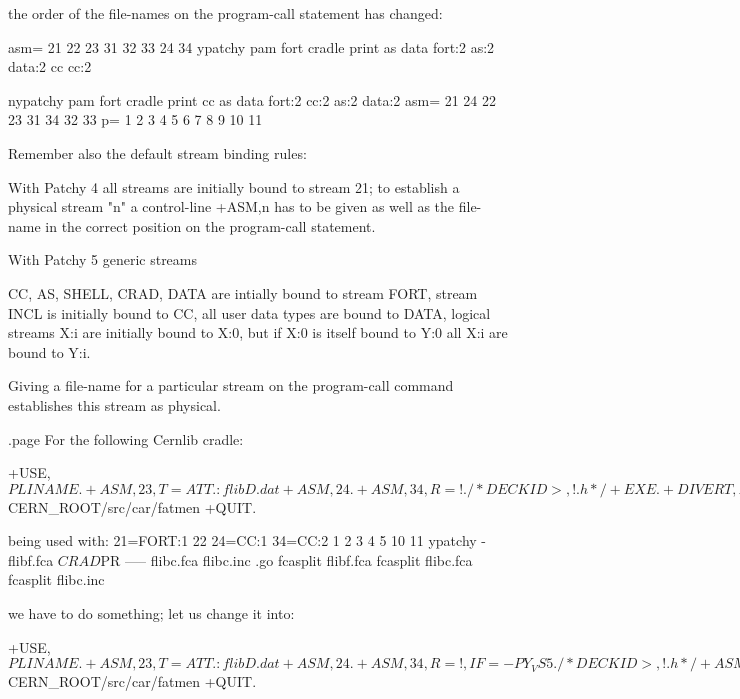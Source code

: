 the order of the file-names on the program-call statement has changed:

       asm=     21                22 23   31     32     33     24   34
    ypatchy pam fort cradle print as data fort:2 as:2   data:2 cc   cc:2

   nypatchy pam fort cradle print cc as   data   fort:2 cc:2   as:2 data:2
       asm=     21                24 22   23     31     34     32   33
         p= 1   2    3      4     5  6    7      8      9      10   11

Remember also the default stream binding rules:

With Patchy 4 all streams are initially bound to stream 21; to establish
a physical stream "n" a control-line  +ASM,n  has to be given as well
as the file-name in the correct position on the program-call statement.

With Patchy 5 generic streams

      CC, AS, SHELL, CRAD, DATA  are intially bound to stream FORT,
      stream  INCL is initially bound to CC,
      all user data types are bound to DATA,
      logical streams X:i are initially bound to X:0, but if X:0
      is itself bound to Y:0 all X:i are bound to Y:i.

      Giving a file-name for a particular stream on the program-call
      command establishes this stream as physical.

.page
For the following Cernlib cradle:

      +USE, ${PLINAME}.
      +ASM, 23, T=ATT    .:flibD.dat
      +ASM, 24.
      +ASM, 34, R=!      ./*DECK ID>, !.h */
      +EXE.
      +DIVERT, FMH.
      +USE, *FATLIB.
      ...
      +PAM, 11, T=C,ATT     .${CERN_ROOT}/src/car/fatmen
      +QUIT.

      being used with:
                    21=FORT:1           22    24=CC:1   34=CC:2
                  1 2         3     4   5     10        11
          ypatchy - flibf.fca $CRAD $PR ----- flibc.fca flibc.inc .go
          fcasplit flibf.fca
          fcasplit flibc.fca
          fcasplit flibc.inc

   we have to do something; let us change it into:

      +USE, ${PLINAME}.
      +ASM, 23, T=ATT    .:flibD.dat
      +ASM, 24.
      +ASM, 34, R=!,  IF=-PY_VS5     ./*DECK ID>, !.h */
      +ASM, 34, T=REASSIGN, S=INCL, IF=PY_VS5.
      +EXE.
      +DIVERT, FMH.
      +USE, *FATLIB.
      ...
      +PAM, 11, T=C,ATT     .${CERN_ROOT}/src/car/fatmen
      +QUIT.

